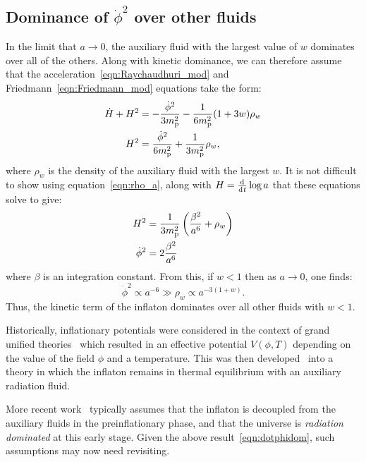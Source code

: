 \subsection{Dominance of \(\dot{\phi}^2\) over other fluids}
\label{sec:dominance_fluids}
In the limit that \(a\to 0\), the auxiliary fluid with the largest value of \(w\) dominates over all of the others. Along with kinetic dominance, we can therefore assume that the acceleration~\eqref{eqn:Raychaudhuri_mod} and Friedmann~\eqref{eqn:Friedmann_mod} equations take the form:
%
\begin{align}
  \dot{H}+H^2 
  &= 
  -\frac{\dot{\phi}^2}{3m_{\mathrm{p}}^2} - \frac{1}{6m_{\mathrm{p}}^2}(1+3w)\rho_w
  \label{eqn:Ray_KD_eq_rho}
  \\
  H^2 
  &= 
  \frac{\dot{\phi}^2}{6m_{\mathrm{p}}^2} +  \frac{1}{3m_{\mathrm{p}}^2}\rho_w,
  \label{eqn:Friedmann_KD_eq_rho}
\end{align}
where \(\rho_w\) is the density of the auxiliary fluid with the largest \(w\).  It is not difficult to show using equation~\eqref{eqn:rho_a},
along with \(H=\frac{\operatorname{d}^{}\!{}}{\operatorname{d}^{}\!{t}}\log a\) that these equations solve to give:
%
\begin{align}
  H^2 
  &= 
  \frac{1}{3m_{\mathrm{p}}^2}\left(\frac{\beta^2}{a^6} + \rho_w\right) 
  \label{eqn:H_of_a_1}
  \\
  \dot{\phi}^2 
  &= 
  2\frac{\beta^2}{a^6} 
  \label{eqn:dotphi_of_a_1}
\end{align}
%
where \(\beta\) is an integration constant. From this, if \(w<1\) then as
\(a\to 0\), one finds:
%
\begin{equation}
  \dot{\phi}^2 \propto a^{-6} 
  \gg
  \rho_w \propto a^{-3(1+w)}.
  \label{eqn:dotphidom}
\end{equation}
%
Thus, the kinetic term of the inflaton dominates over all other fluids with \(w<1\).




Historically, inflationary potentials were considered in the context of grand unified theories~\citep{PhysRevLett.48.1220,linde_1982} which resulted in an effective potential \(V(\phi,T)\) depending on the value of the field \(\phi\) and a temperature.  This was then developed~\citep{1995PhRvL..74.1912B,PhysRevLett.75.3218} into a theory in which the inflaton remains in thermal equilibrium with an auxiliary radiation fluid.

More recent work~\citep{2007PhRvD..76f3512P} typically assumes that the inflaton is decoupled from the auxiliary fluids in the preinflationary phase, and that the universe is {\em radiation dominated\/} at this early stage. Given the above result~\eqref{eqn:dotphidom}, such assumptions may now need revisiting.



